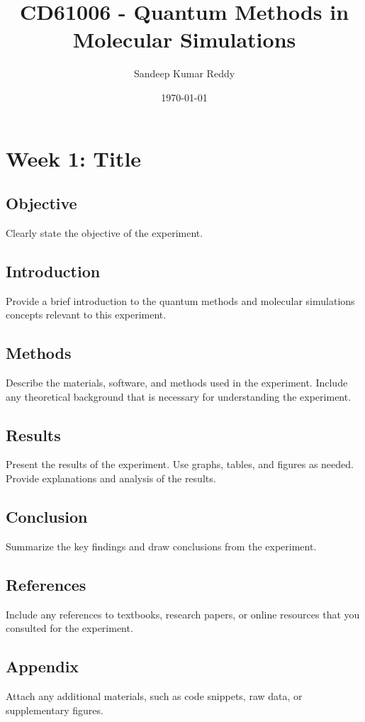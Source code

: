 \documentclass[a4paper,twoside,symmetric]{tufte-handout}
\title{CD61006 - Quantum Methods in Molecular Simulations}
\author{Sandeep Kumar Reddy}
\date{\today}
\begin{document}
\maketitle

\section*{Week 1: Title } 

\subsection*{Objective}
Clearly state the objective of the experiment.

\subsection*{Introduction}
Provide a brief introduction to the quantum methods and molecular simulations concepts relevant to this experiment.

\subsection*{Methods}
Describe the materials, software, and methods used in the experiment. Include any theoretical background that is necessary for understanding the experiment.

\subsection*{Results}
Present the results of the experiment. Use graphs, tables, and figures as needed. Provide explanations and analysis of the results.

\subsection*{Conclusion}
Summarize the key findings and draw conclusions from the experiment.

\subsection*{References}
Include any references to textbooks, research papers, or online resources that you consulted for the experiment.

\subsection*{Appendix}
Attach any additional materials, such as code snippets, raw data, or supplementary figures.
\end{document}
